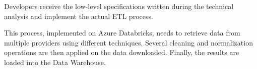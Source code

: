 Developers receive the low-level specifications written during the technical analysis and implement the actual ETL process.

This process, implemented on Azure Databricks, needs to retrieve data from multiple providers using different techniques.
Several cleaning and normalization operations are then applied on the data downloaded.
Finally, the results are loaded into the Data Warehouse.